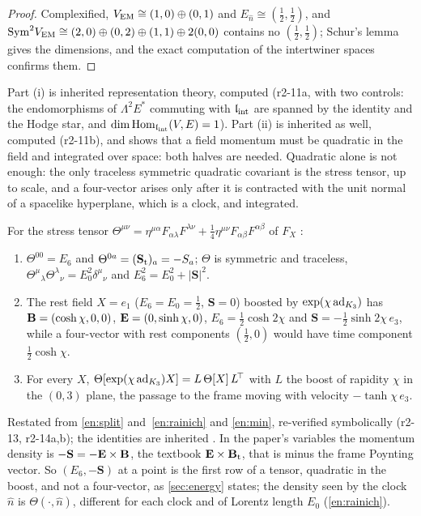 \begin{proof}
Complexified, $V_{\rm EM}\cong(1,0)\oplus(0,1)$ and $E_{\hat n}\cong(\tfrac12,\tfrac12)$, and $\mathrm{Sym}^2V_{\rm EM}\cong(2,0)\oplus(0,2)\oplus(1,1)\oplus2(0,0)$
contains no $(\tfrac12,\tfrac12)$; Schur's lemma \cite{GoodmanWallach} gives the dimensions, and the exact computation of the intertwiner spaces
confirms them.
\end{proof}

Part (i) is inherited representation theory, computed (r2-11a, with two controls: the endomorphisms of $\Lambda^2E^*$ commuting with $\mathfrak l_{\rm int}$ are spanned by the identity
and the Hodge star, and $\dim\operatorname{Hom}_{\mathfrak l_{\rm int}}(V,E)=1$). Part (ii) is inherited as well,
computed (r2-11b), and shows that a field momentum must be quadratic in the field and integrated over space: both halves are needed. Quadratic alone is not enough: the only traceless symmetric quadratic covariant is the stress tensor, up to scale, and a four-vector arises only after it is
contracted with the unit normal of a spacelike hyperplane, which is a clock, and integrated.

\begin{proposition}
\label{r2:prop:stress}
For the stress tensor $\Theta^{\mu\nu}=\eta^{\mu\alpha}F_{\alpha\lambda}F^{\lambda\nu}+\tfrac14\eta^{\mu\nu}F_{\alpha\beta}F^{\alpha\beta}$ of $F_X$
\cite{Jackson}:
\begin{enumerate}[label=(\roman*),leftmargin=2.2em]
\item $\Theta^{00}=E_6$ and $\Theta^{0a}=(\mathbf S_{\rm t})_a=-S_a$; $\Theta$ is symmetric and traceless, $\Theta^\mu{}_\lambda\Theta^\lambda{}_\nu=E_0^2\delta^\mu{}_\nu$ and
$E_6^2=E_0^2+|\mathbf S|^2$.
\item The rest field $X=e_1$ ($E_6=E_0=\tfrac12$, $\mathbf S=0$) boosted by $\exp(\chi\operatorname{ad}_{K_3})$ has $\mathbf B=(\cosh\chi,0,0)$, $\mathbf E=(0,\sinh\chi,0)$,
$E_6=\tfrac12\cosh2\chi$ and $\mathbf S=-\tfrac12\sinh2\chi\,e_3$, while a four-vector with rest components $(\tfrac12,0)$ would have time component
$\tfrac12\cosh\chi$.
\item For every $X$, $\Theta[\exp(\chi\operatorname{ad}_{K_3})X]=L\,\Theta[X]\,L^{\!\top}$ with $L$ the boost of rapidity $\chi$ in the $(0,3)$ plane, the passage to the
frame moving with velocity $-\tanh\chi\,e_3$.
\end{enumerate}
\end{proposition}

Restated from \cref{en:split} and~\cref{en:rainich} and \cref{en:min}, re-verified symbolically (r2-13, r2-14a,b); the identities are inherited
\cite{Rainich1925,LandauLifshitz2}. In the paper's variables the momentum density is $-\mathbf S=-\mathbf E\times\mathbf B$, the textbook $\mathbf E\times\mathbf B_{\rm t}$, that is minus the frame
Poynting vector. So $(E_6,-\mathbf S)$ at a point is the first row of a tensor, quadratic in the boost, and not a four-vector, as \cref{sec:energy} states; the density seen by the clock $\hat n$ is $\Theta(\cdot,\hat n)$, different for each clock and of Lorentz length $E_0$
(\cref{en:rainich}).

